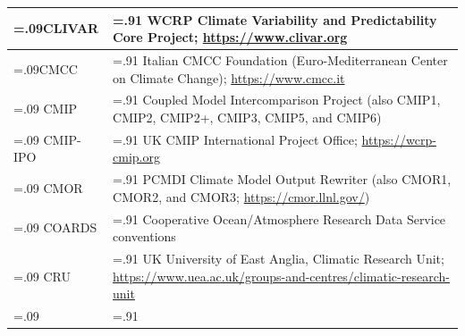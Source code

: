 \documentclass[manuscript]{copernicus}
\begin{document}
\begin{table}[htp]
{\begin{tabularx}{1\textwidth} { 
	  | >{\raggedright\arraybackslash\hsize=.09\hsize}X
	  | >{\centering\arraybackslash\hsize=.91\hsize}X | }
CLIVAR & WCRP Climate Variability and Predictability Core Project; \url{https://www.clivar.org}\\ \hline
CMCC & Italian CMCC Foundation (Euro-Mediterranean Center on Climate Change); \url{https://www.cmcc.it}\\ \hline
CMIP & Coupled Model Intercomparison Project (also CMIP1, CMIP2, CMIP2+, CMIP3, CMIP5, and CMIP6)\\ \hline
CMIP-IPO & UK CMIP International Project Office; \url{https://wcrp-cmip.org}\\ \hline
CMOR & PCMDI Climate Model Output Rewriter (also CMOR1, CMOR2, and CMOR3; \url{https://cmor.llnl.gov/})\\ \hline
COARDS & Cooperative Ocean/Atmosphere Research Data Service conventions\\ \hline
CRU & UK University of East Anglia, Climatic Research Unit; \url{https://www.uea.ac.uk/groups-and-centres/climatic-research-unit}\\ \hline
\multicolumn{2}{l}{\textbf{\autoref{tab:tabAppE1-Acronyms} continued overpage..}}\\
\end{tabularx}
} %
\label{tab:tabAppE1-Acronyms}
\end{table}
\end{document}
